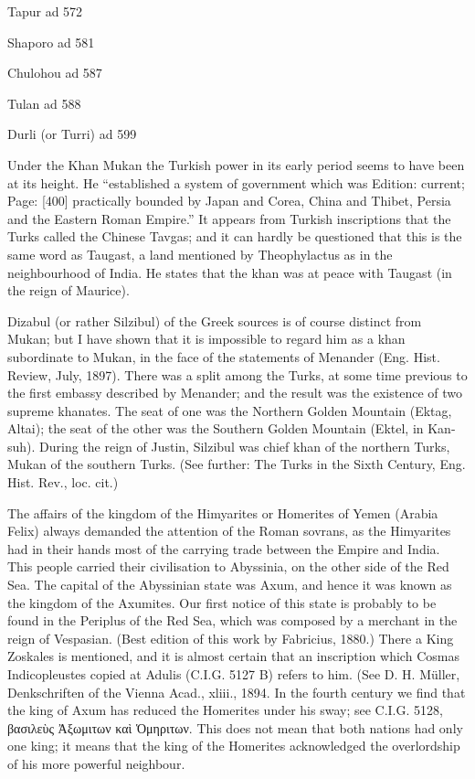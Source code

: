 Tapur ad 572

Shaporo ad 581

Chulohou ad 587

Tulan ad 588

Durli (or Turri) ad 599

Under the Khan Mukan the Turkish power in its early period seems to have been at its height. He \texthebrew{“}established a system of government which was Edition: current; Page: [400] practically bounded by Japan and Corea, China and Thibet, Persia and the Eastern Roman Empire.\texthebrew{}” It appears from Turkish inscriptions that the Turks called the Chinese Tavgas; and it can hardly be questioned that this is the same word as Taugast, a land mentioned by Theophylactus as in the neighbourhood of India. He states that the khan was at peace with Taugast (in the reign of Maurice).

Dizabul (or rather Silzibul) of the Greek sources is of course distinct from Mukan; but I have shown that it is impossible to regard him as a khan subordinate to Mukan, in the face of the statements of Menander (Eng. Hist. Review, July, 1897). There was a split among the Turks, at some time previous to the first embassy described by Menander; and the result was the existence of two supreme khanates. The seat of one was the Northern Golden Mountain (Ektag, Altai); the seat of the other was the Southern Golden Mountain (Ektel, in Kan-suh). During the reign of Justin, Silzibul was chief khan of the northern Turks, Mukan of the southern Turks. (See further: The Turks in the Sixth Century, Eng. Hist. Rev., loc. cit.)


The affairs of the kingdom of the Himyarites or Homerites of Yemen (Arabia Felix) always demanded the attention of the Roman sovrans, as the Himyarites had in their hands most of the carrying trade between the Empire and India. This people carried their civilisation to Abyssinia, on the other side of the Red Sea. The capital of the Abyssinian state was Axum, and hence it was known as the kingdom of the Axumites. Our first notice of this state is probably to be found in the Periplus of the Red Sea, which was composed by a merchant in the reign of Vespasian. (Best edition of this work by Fabricius, 1880.) There a King Zoskales is mentioned, and it is almost certain that an inscription which Cosmas Indicopleustes copied at Adulis (C.I.G. 5127 B) refers to him. (See D. H. Müller, Denkschriften of the Vienna Acad., xliii., 1894. In the fourth century we find that the king of Axum has reduced the Homerites under his sway; see C.I.G. 5128, \textgreek{βασιλε\texthebrew{ὺ}ς \texthebrew{Ἀ}ξωμιτων κα\texthebrew{ὶ Ὁ}μηριτων}. This does not mean that both nations had only one king; it means that the king of the Homerites acknowledged the overlordship of his more powerful neighbour.

